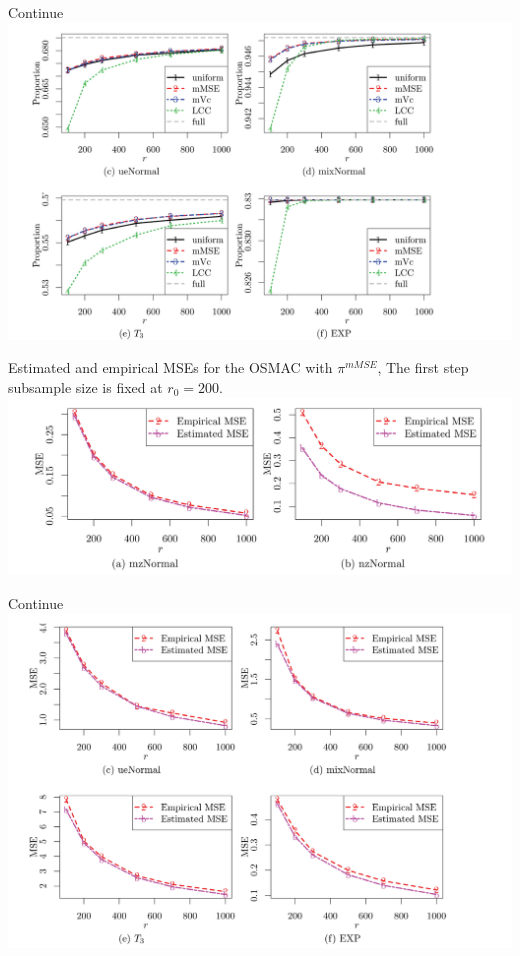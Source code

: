 \documentclass[12pt]{beamer}
\begin{document}
\begin{frame}{Continue}
\includegraphics[scale=0.8]{fig7.png} 
\end{frame}

\begin{frame}{Estimated and empirical MSEs for the OSMAC with $\pi^{mMSE}$, The first step subsample size is fixed at $r_0=200$.}
\includegraphics[scale=0.8]{fig8.png} 
\end{frame}

\begin{frame}{Continue}
\includegraphics[scale=0.8]{fig9.png} 
\end{frame}
\end{document}
